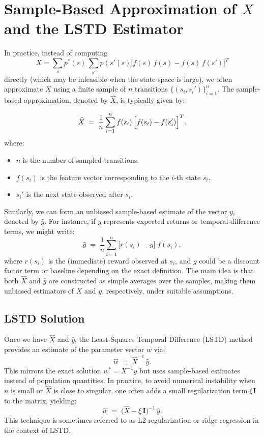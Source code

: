 \section{Sample-Based Approximation of \texorpdfstring{$X$}{X} and the LSTD Estimator}

In practice, instead of computing
\[
X 
= \sum_{s} p^*(s)\,\sum_{s'} p(s' \mid s)
\bigl[f(s)\,f(s) - f(s)\,f(s')\bigr]^T
\]
directly (which may be infeasible when the state space is large), we often approximate $X$ using a finite sample of $n$ transitions \(\{(s_i, s_i')\}_{i=1}^n\). The sample-based approximation, denoted by \(\widehat{X}\), is typically given by:

\[
\widehat{X}
\;=\;
\frac{1}{n}
\sum_{i=1}^n
f(s_i)\,\Bigl[f(s_i) - f(s_i')\Bigr]^T,
\]
where:
\begin{itemize}
    \item $n$ is the number of sampled transitions.
    \item $f(s_i)$ is the feature vector corresponding to the $i$-th state $s_i$.
    \item $s_i'$ is the next state observed after $s_i$.
\end{itemize}

\noindent
Similarly, we can form an unbiased sample-based estimate of the vector $y$, denoted by \(\widehat{y}\). For instance, if $y$ represents expected returns or temporal-difference terms, we might write:
\[
\widehat{y}
\;=\;
\frac{1}{n}
\sum_{i=1}^n
\bigl[r(s_i) - g\bigr]\; f(s_i),
\]
where $r(s_i)$ is the (immediate) reward observed at $s_i$, and $g$ could be a discount factor term or baseline depending on the exact definition. The main idea is that both \(\widehat{X}\) and \(\widehat{y}\) are constructed as simple averages over the samples, making them unbiased estimators of $X$ and $y$, respectively, under suitable assumptions.

\subsection{LSTD Solution}
Once we have \(\widehat{X}\) and \(\widehat{y}\), the Least-Squares Temporal Difference (LSTD) method provides an estimate of the parameter vector $w$ via:
\[
\widehat{w}
\;=\;
\widehat{X}^{-1}\,\widehat{y}.
\]
This mirrors the exact solution \(w^* = X^{-1} y\) but uses sample-based estimates instead of population quantities. In practice, to avoid numerical instability when $n$ is small or $\widehat{X}$ is close to singular, one often adds a small regularization term \(\xi \mathbf{I}\) to the matrix, yielding:
\[
\widehat{w}
\;=\;
\bigl(\widehat{X} + \xi\,\mathbf{I}\bigr)^{-1} \,\widehat{y}.
\]
This technique is sometimes referred to as L2-regularization or ridge regression in the context of LSTD.

